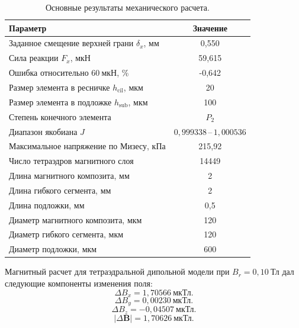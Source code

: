 \documentclass[14pt,a4paper]{extarticle}
\begin{document}
\begin{table}[H]
\centering
\caption{Основные результаты механического расчета.}
\label{tab:baseline_mechanics}
\begin{tabular*}{\textwidth}{@{\extracolsep{\fill}}|p{}|c|}
\hline
Параметр & Значение \\
\hline
Заданное смещение верхней грани \(\delta_x\), мм & 0,550 \\
\hline
Сила реакции \(F_x\), мкН & 59,615 \\
\hline
Ошибка относительно \(60~\text{мкН}\), \% & -0,642 \\
\hline
Размер элемента в ресничке \(h_{\mathrm{cil}}\), мкм & 20 \\
\hline
Размер элемента в подложке \(h_{\mathrm{sub}}\), мкм & 100 \\
\hline
Степень конечного элемента & \(P_2\) \\
\hline
Диапазон якобиана \(J\) & \(0,999338\,\text{--}\,1,000536\) \\
\hline
Максимальное напряжение по Мизесу, кПа & 215,92 \\
\hline
Число тетраэдров магнитного слоя & 14449 \\
\hline
Длина магнитного композита, мм & 2 \\
\hline
Длина гибкого сегмента, мм & 2 \\
\hline
Длина подложки, мм & 0,5 \\
\hline
Диаметр магнитного композита, мкм & 120 \\
\hline
Диаметр гибкого сегмента, мкм & 120 \\
\hline
Диаметр подложки, мкм & 600 \\
\end{tabular*}
\end{table}

Магнитный расчет для тетраэдральной дипольной модели при \(B_r=0,10~\text{Тл}\) дал следующие компоненты изменения поля:
\begin{equation}
    \Delta B_x=1,70566~\text{мкТл}.
\end{equation}
\begin{equation}
    \Delta B_y=0,00230~\text{мкТл}.
\end{equation}
\begin{equation}
    \Delta B_z=-0,04507~\text{мкТл}.
\end{equation}
\begin{equation}
    |\Delta\mathbf{B}|=1,70626~\text{мкТл}.
\end{equation}
\end{document}
